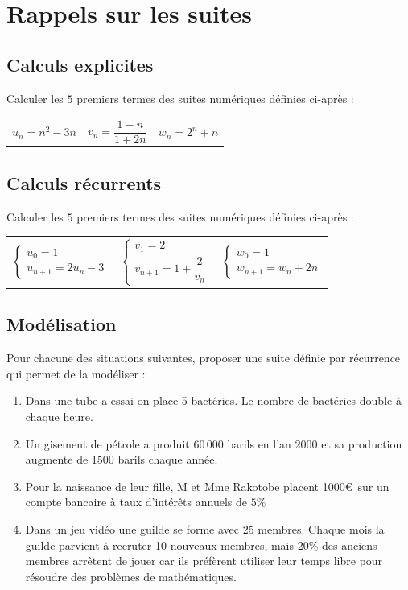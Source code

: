 \documentclass[oneside,12pt]{article}          %
\begin{document}
\section{Rappels sur les suites}

\subsection{Calculs explicites}
Calculer les $5$ premiers termes des suites numériques définies ci-après :

\begin{tabular}{p{} p{} p{}}
	$u_n = n^2 - 3n$ & $v_n = \dfrac{1-n}{1+2n}$ & $w_n = 2^n + n$
\end{tabular}



\subsection{Calculs récurrents}
Calculer les $5$ premiers termes des suites numériques définies ci-après :

\begin{tabular}{p{} p{} p{}}
	$\begin{cases} u_0 = 1 \\ u_{n+1} = 2u_n - 3\end{cases}$ &
	$\begin{cases} v_1 = 2 \\ v_{n+1} = 1 + \dfrac{2}{v_n} \end{cases}$ &
	$\begin{cases} w_0 = 1 \\ w_{n+1} = w_n + 2n \end{cases}$
\end{tabular}



\subsection{Modélisation}
Pour chacune des situations suivantes, proposer une suite définie par récurrence qui permet de la modéliser :
\begin{enumerate}
    \item Dans une tube a essai on place 5 bactéries. Le nombre de bactéries double à chaque heure.
    \item Un gisement de pétrole a produit 60\,000 barils en l'an 2000 et sa production augmente de 1500 barils chaque année.
    \item Pour la naissance de leur fille, M et Mme Rakotobe placent 1000\euro\, sur un compte bancaire à taux d'intérêts annuels de $5\%$
    \item Dans un jeu vidéo une guilde se forme avec 25 membres. Chaque mois la guilde parvient à recruter 10 nouveaux membres, mais 20\% des anciens membres arrêtent de jouer car ils préfèrent utiliser leur temps libre pour résoudre des problèmes de mathématiques.
\end{enumerate}
\end{document}
